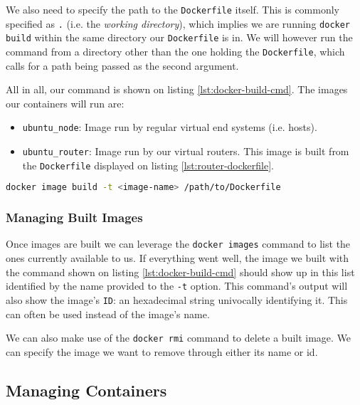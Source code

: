                 We also need to specify the path to the \texttt{Dockerfile} itself. This is commonly specified as \texttt{.} (i.e. the \textit{working directory}), which implies we are running \texttt{docker build} within the same directory our \texttt{Dockerfile} is in. We will however run the command from a directory other than the one holding the \texttt{Dockerfile}, which calls for a path being passed as the second argument.

                All in all, our command is shown on listing \ref{lst:docker-build-cmd}. The images our containers will run are:

                \begin{itemize}
                    \item \texttt{ubuntu\_node}: Image run by regular virtual end systems (i.e. hosts).
                    \item \texttt{ubuntu\_router}: Image run by our virtual routers. This image is built from the \texttt{Dockerfile} displayed on listing \ref{lst:router-dockerfile}.
                \end{itemize}

                \begin{lstlisting}[language = bash, caption = Building an image from a \texttt{Dockerfile}., label = lst:docker-build-cmd]
                    docker image build -t <image-name> /path/to/Dockerfile
                \end{lstlisting}

            \subsubsection{Managing Built Images}
                Once images are built we can leverage the \texttt{docker images} command to list the ones currently available to us. If everything went well, the image we built with the command shown on listing \ref{lst:docker-build-cmd} should show up in this list identified by the name provided to the \texttt{-t} option. This command's output will also show the image's \texttt{ID}: an hexadecimal string univocally identifying it. This can often be used instead of the image's name.

                We can also make use of the \texttt{docker rmi} command to delete a built image. We can specify the image we want to remove through either its name or id.

        \subsection{Managing Containers}
